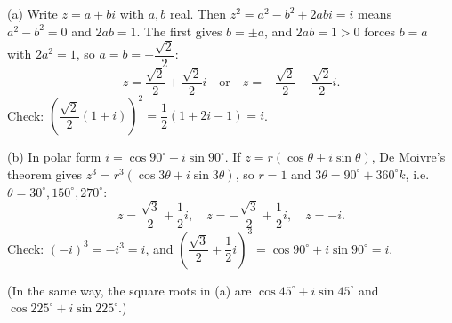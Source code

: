 (a) Write $z=a+bi$ with $a,b$ real. Then $z^2=a^2-b^2+2abi=i$ means $a^2-b^2=0$ and $2ab=1$. The first gives $b=\pm a$, and $2ab=1>0$ forces $b=a$ with $2a^2=1$, so $a=b=\pm\dfrac{\sqrt2}{2}$:
\[
\boxed{z=\dfrac{\sqrt2}{2}+\dfrac{\sqrt2}{2}i\quad\text{or}\quad z=-\dfrac{\sqrt2}{2}-\dfrac{\sqrt2}{2}i}.
\]
Check: $\left(\dfrac{\sqrt2}{2}(1+i)\right)^2=\dfrac{1}{2}(1+2i-1)=i$.

(b) In polar form $i=\cos90^\circ+i\sin90^\circ$. If $z=r(\cos\theta+i\sin\theta)$, De Moivre's theorem gives $z^3=r^3(\cos3\theta+i\sin3\theta)$, so $r=1$ and $3\theta=90^\circ+360^\circ k$, i.e.\ $\theta=30^\circ,150^\circ,270^\circ$:
\[
\boxed{z=\dfrac{\sqrt3}{2}+\dfrac{1}{2}i,\quad z=-\dfrac{\sqrt3}{2}+\dfrac{1}{2}i,\quad z=-i}.
\]
Check: $(-i)^3=-i^3=i$, and $\left(\dfrac{\sqrt3}{2}+\dfrac{1}{2} i\right)^3=\cos90^\circ+i\sin90^\circ=i$.

(In the same way, the square roots in (a) are $\cos45^\circ+i\sin45^\circ$ and $\cos225^\circ+i\sin225^\circ$.)
